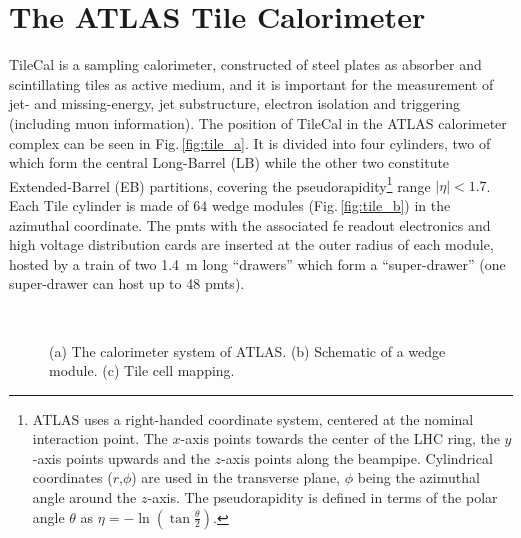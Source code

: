 \section{The ATLAS Tile Calorimeter}
\label{sec:TileCal}

\gls{TileCal} is a sampling calorimeter, constructed of steel plates as absorber and scintillating tiles as active 
medium, and it is important for the measurement of jet- and missing-energy, jet substructure, electron isolation and 
triggering (including muon information). The position of \gls{TileCal} in the ATLAS calorimeter complex can be seen 
in Fig.\,\ref{fig:tile_a}. It is divided into four cylinders, two of which form the central Long-Barrel (LB) while 
the other two constitute Extended-Barrel (EB) partitions, covering the pseudorapidity\footnote{
ATLAS uses a right-handed coordinate system, centered at the nominal interaction point. 
The $x$-axis points towards the center of the LHC ring, the $y$-axis points upwards and 
the $z$-axis points along the beampipe. Cylindrical coordinates ($r$,$\phi$) are used in 
the transverse plane, $\phi$ being the azimuthal angle around the $z$-axis. The pseudorapidity 
is defined in terms of the polar angle $\theta$ as $\eta = -\ln(\tan\frac{\theta}{2})$.}
range $|\eta|<1.7$. Each Tile cylinder is made of $64$ wedge modules (Fig.\,\ref{fig:tile_b}) in the azimuthal
coordinate. The \glspl{pmt} with the associated \gls{fe} readout electronics and high voltage distribution cards 
are inserted at the outer radius of each module, hosted by a train of two \SI{1.4}{m} long ``drawers'' which form
a ``super-drawer'' (one super-drawer can host up to 48 \glspl{pmt}).

\begin{figure}[t]
  \begin{center}
    \\
    \caption{(a) The calorimeter system of ATLAS. (b) Schematic of a wedge module. (c) Tile cell mapping.
    \label{fig:general-context:tilcal-views}}
  \end{center}
\end{figure}

